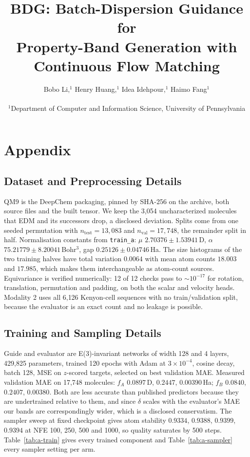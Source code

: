 \documentclass{article}
\title{BDG: Batch-Dispersion Guidance for\\Property-Band Generation with Continuous Flow Matching}
\author{
  Bobo Li,$^{1}$ Henry Huang,$^{1}$ Idea Idehpour,$^{1}$ Haimo Fang$^{1}$\\
  \\
  $^{1}$Department of Computer and Information Science, University of Pennsylvania
}
\begin{document}





\appendix
\section{Appendix}

\subsection{Dataset and Preprocessing Details}
QM9 is the DeepChem packaging, pinned by SHA-256 on the archive, both source files
and the built tensor. We keep the 3{,}054 uncharacterized molecules that EDM and
its successors drop, a disclosed deviation. Splits come from one seeded permutation
with $n_{\mathrm{test}}=13{,}083$ and $n_{\mathrm{val}}=17{,}748$, the remainder
split in half. Normalisation constants from \texttt{train\_a}: $\mu$
$2.70376\pm1.53941$\,D, $\alpha$ $75.21779\pm8.20041$\,Bohr$^3$, gap
$0.25126\pm0.04746$\,Ha. The size histograms of the two training halves have total
variation $0.0064$ with mean atom counts $18.003$ and $17.985$, which makes them
interchangeable as atom-count sources. Equivariance is verified numerically: 12 of
12 checks pass to $\sim10^{-17}$ for rotation, translation, permutation and padding,
on both the scalar and velocity heads. Modality 2 uses all 6{,}126 Kenyon-cell
sequences with no train/validation split, because the evaluator is an exact count
and no leakage is possible.

\subsection{Training and Sampling Details}
Guide and evaluator are E(3)-invariant networks of width 128 and 4 layers,
429{,}825 parameters, trained 120 epochs with Adam at $3\times10^{-4}$, cosine
decay, batch 128, MSE on $z$-scored targets, selected on best validation MAE.
Measured validation MAE on 17{,}748 molecules: $f_A$ $0.0897$\,D, $0.2447$,
$0.00390$\,Ha; $f_B$ $0.0840$, $0.2407$, $0.00380$. Both are less accurate than
published predictors because they are undertrained relative to them, and since
$\delta$ scales with the evaluator's MAE our bands are correspondingly wider, which
is a disclosed conservatism. The sampler sweep at fixed checkpoint gives atom
stability $0.9334$, $0.9388$, $0.9399$, $0.9394$ at NFE 100, 250, 500 and 1000, so
quality saturates by 500 steps. Table~\ref{tab:a-train} gives every trained
component and Table~\ref{tab:a-sampler} every sampler setting per arm.
\end{document}
